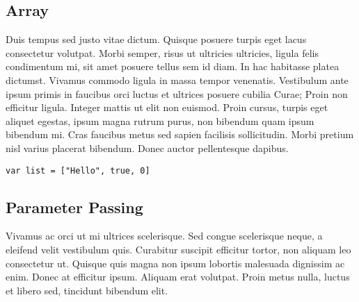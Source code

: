 \subsection{Array}
Duis tempus sed justo vitae dictum. Quisque posuere turpis eget lacus consectetur volutpat. Morbi semper, risus ut ultricies ultricies, ligula felis condimentum mi, sit amet posuere tellus sem id diam. In hac habitasse platea dictumst. Vivamus commodo ligula in massa tempor venenatis. Vestibulum ante ipsum primis in faucibus orci luctus et ultrices posuere cubilia Curae; Proin non efficitur ligula. Integer mattis ut elit non euismod. Proin cursus, turpis eget aliquet egestas, ipsum magna rutrum purus, non bibendum quam ipsum bibendum mi. Cras faucibus metus sed sapien facilisis sollicitudin. Morbi pretium nisl varius placerat bibendum. Donec auctor pellentesque dapibus.
\begin{lstlisting}[language=Lucy]
  var list = ["Hello", true, 0]
\end{lstlisting}

\subsection{Parameter Passing}
Vivamus ac orci ut mi ultrices scelerisque. Sed congue scelerisque neque, a eleifend velit vestibulum quis. Curabitur suscipit efficitur tortor, non aliquam leo consectetur ut. Quisque quis magna non ipsum lobortis malesuada dignissim ac enim. Donec at efficitur ipsum. Aliquam erat volutpat. Proin metus nulla, luctus et libero sed, tincidunt bibendum elit.
